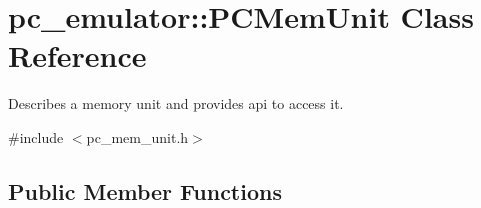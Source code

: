 \hypertarget{classpc__emulator_1_1PCMemUnit}{}\section{pc\+\_\+emulator\+:\+:P\+C\+Mem\+Unit Class Reference}
\label{classpc__emulator_1_1PCMemUnit}


Describes a memory unit and provides api to access it.  




{\ttfamily \#include $<$pc\+\_\+mem\+\_\+unit.\+h$>$}

\subsection*{Public Member Functions}
